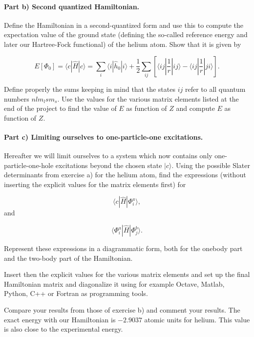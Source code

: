 \documentclass[%
oneside,                 %
final,                   %
10pt]{article}
\begin{document}
\paragraph{Part b) Second quantized Hamiltonian.}
Define the Hamiltonian in a second-quantized form and use this to
compute the expectation value of the ground state (defining the
so-called reference energy and later our Hartree-Fock functional) of
the helium atom.  Show that it is given by

\begin{equation*}
  E[\Phi_0] = \langle c | \hat{H}| c \rangle 
  = \sum_{i} \langle i | \hat{h}_0 | i\rangle+ \frac{1}{2}\sum_{ij}\left[\langle ij |\frac{1}{r}|ij\rangle-\langle ij |\frac{1}{r}|ji\rangle\right].
\end{equation*}

Define properly the sums keeping in mind that the states $ij$ refer to
all quantum numbers $nlm_lsm_s$.  Use the values for the various
matrix elements listed at the end of the project to find the value of
$E$ as function of $Z$ and compute $E$ as function of $Z$.

\paragraph{Part c) Limiting ourselves to one-particle-one excitations.}
Hereafter we will limit ourselves to a system which now contains only
one-particle-one-hole excitations beyond the chosen state $|c\rangle$.
Using the possible Slater determinants from exercise a) for the helium
atom, find the expressions (without inserting the explicit values for
the matrix elements first) for

\begin{equation*}
\langle c | \hat{H}| \Phi_i^a \rangle,
\end{equation*}
and

\begin{equation*}
\langle \Phi_i^a | \hat{H}| \Phi_j^b \rangle.
\end{equation*}

Represent these expressions in a diagrammatic form, both for the
onebody part and the two-body part of the Hamiltonian.

Insert then the explicit values for the various matrix elements and
set up the final Hamiltonian matrix and diagonalize it using for
example Octave, Matlab, Python, C++ or Fortran as programming tools.

Compare your results from those of exercise b) and comment your results. 
The exact energy with our Hamiltonian is $-2.9037$ atomic units for helium. This value is also close to the experimental energy.
\end{document}
